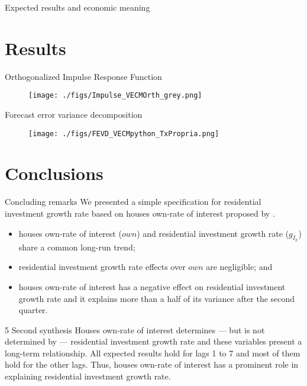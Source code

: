 \documentclass[10pt]{beamer}
\begin{document}
\begin{frame}[label={sec:org8798aca}]{Expected results and economic meaning}


\end{frame}


\section{Results}
\label{sec:orgfedc2ca}

\begin{frame}[label={sec:org585341b}]{Orthogonalized Impulse Response Function}
\begin{figure}[H]
	\centering
	\texttt{[image: ./figs/Impulse\_VECMOrth\_grey.png]}
\end{figure}
\end{frame}
\begin{frame}[label={sec:orgc40ca72}]{Forecast error variance decomposition}
\begin{figure}[H]
	\centering
	\texttt{[image: ./figs/FEVD\_VECMpython\_TxPropria.png]}
\end{figure}
\end{frame}

\section{Conclusions}
\label{sec:org54dc19a}
\begin{frame}[label={sec:org6f32832}]{Concluding remarks}
We presented a simple specification for residential investment growth rate based on houses own-rate of interest proposed by \textcite{teixeira_crescimento_2015}.
\begin{itemize}
\item houses own-rate of interest (\(own\)) and residential investment growth rate (\(g_{I_h}\)) share a common long-run trend;
\item residential investment growth rate effects over \(own\) are negligible; and
\item houses own-rate of interest has a negative effect on residential investment growth rate and it explains more than a half of its variance after the second quarter.
\end{itemize}

\begin{block}{5 Second synthesis}
Houses own-rate of interest determines — but is not determined by — residential investment growth rate and these variables
present a long-term relationship.
All expected results hold for lags 1 to 7 and most of them hold for the other lags.
Thus, houses own-rate of interest has a prominent role in explaining residential investment growth rate.
\end{block}
\end{frame}
\end{document}
